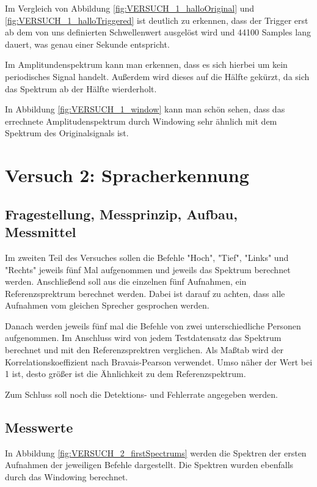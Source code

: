\documentclass[12pt, oneside, a4paper, \docLanguage]{report}
\begin{document}
Im Vergleich von Abbildung \ref{fig:VERSUCH_1_halloOriginal} und \ref{fig:VERSUCH_1_halloTriggered} ist deutlich zu erkennen, dass der Trigger erst ab dem von uns definierten Schwellenwert ausgelöst wird und 44100 Samples lang dauert, was genau einer Sekunde entspricht.

Im Amplitundenspektrum kann man erkennen, dass es sich hierbei um kein periodisches Signal handelt. Außerdem wird dieses auf die Hälfte gekürzt, da sich das Spektrum ab der Hälfte wierderholt.

In Abbildung \ref{fig:VERSUCH_1_window} kann man schön sehen, dass das errechnete Amplitudenspektrum durch Windowing sehr  ähnlich mit dem Spektrum des Originalsignals ist.

%
%
\chapter{Versuch 2: Spracherkennung}
\label{chap:VERSUCH_2}

\section{Fragestellung, Messprinzip, Aufbau, Messmittel}
\label{chap:VERSUCH_2_FRAGESTELLUNG}
Im zweiten Teil des Versuches sollen die Befehle "Hoch", "Tief", "Links" und "Rechts" jeweils fünf Mal aufgenommen und jeweils das Spektrum berechnet werden. Anschließend soll aus die einzelnen fünf Aufnahmen, ein Referenzsprektrum berechnet werden. Dabei ist darauf zu achten, dass alle Aufnahmen vom gleichen Sprecher gesprochen werden.

Danach werden jeweils fünf mal die Befehle von zwei unterschiedliche Personen aufgenommen. Im Anschluss wird von jedem Testdatensatz das Spektrum berechnet und mit den Referenzsprektren verglichen. Als Maßtab wird der Korrelationskoeffizient nach Bravais-Pearson verwendet. Umso näher der Wert bei 1 ist, desto größer ist die Ähnlichkeit zu dem Referenzspektrum.

Zum Schluss soll noch die Detektions- und Fehlerrate angegeben werden.
\newpage
\section{Messwerte}
\label{chap:VERSUCH_2_MESSWERTE}
In Abbildung \ref{fig:VERSUCH_2_firstSpectrums} werden die Spektren der ersten Aufnahmen der jeweiligen Befehle dargestellt. Die Spektren wurden ebenfalls durch das Windowing berechnet.
\end{document}
